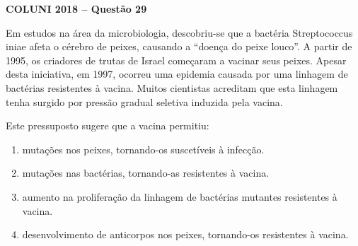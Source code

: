 \textbf{COLUNI 2018 -- Questão 29}\par\medskip Em estudos na área da microbiologia, descobriu-se que a bactéria Streptococcus iniae afeta o cérebro de peixes, causando a “doença do peixe louco”. A partir de 1995, os criadores de trutas de Israel começaram a vacinar seus peixes. Apesar desta iniciativa, em 1997, ocorreu uma epidemia causada por uma linhagem de bactérias resistentes à vacina. Muitos cientistas acreditam que esta linhagem tenha surgido por pressão gradual seletiva induzida pela vacina.

\par

Este pressuposto sugere que a vacina permitiu:\begin{enumerate}
\item mutações nos peixes, tornando-os suscetíveis à infecção.
\item mutações nas bactérias, tornando-as resistentes à vacina.
\item aumento na proliferação da linhagem de bactérias mutantes resistentes à vacina.
\item desenvolvimento de anticorpos nos peixes, tornando-os resistentes à vacina.\end{enumerate}
